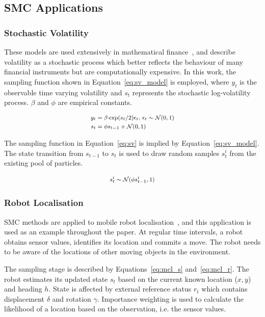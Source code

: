 \subsection{SMC Applications}
\subsubsection{Stochastic Volatility}
\label{sec:vol}

These models are used extensively in mathematical
finance~\cite{casarin04,weng12}, and describe volatility as a
stochastic process which better reflects the behaviour of many
financial instruments but are computationally expensive. In this
work, the sampling function shown in Equation~\ref{eq:sv_model} is employed,
where $y_t$ is the observable time varying volatility and $s_t$ represents the stochastic log-volatility process.
$\beta$ and $\phi$ are empirical constants.

\begin{equation}
\footnotesize
\begin{aligned}
	y_t &= \beta \exp(s_t/2)\epsilon_t \mbox{, } \epsilon_t \sim \mathcal{N}(0,1) \\
	s_t &= \phi s_{t-1} + \mathcal{N}(0,1)
\end{aligned}
\label{eq:sv_model}
\end{equation}

The sampling function in Equation~\ref{eq:sv} is implied by Equation~\ref{eq:sv_model}.
The state transition from $s_{t-1}$ to $s_t$ is used to draw random samples $s^i_t$ from the existing pool of particles.

\begin{equation}
\footnotesize
\begin{aligned}
	s^i_{t} \sim \mathcal{N}(\phi s^i_{t-1},1)
\end{aligned}
\label{eq:sv}
\end{equation}

\subsubsection{Robot Localisation}
SMC methods are applied to mobile robot localisation~\cite{montemerlo02},
and this application is used as an example throughout the paper.
At regular time intervals, a robot obtains sensor values, identifies its location and commits a move.
The robot needs to be aware of the locations of other moving objects in the environment.

The sampling stage is described by Equations~\ref{eq:mcl_s} and~\ref{eq:mcl_r}. 
The robot estimates its updated state $s_t$ based on the current known location ($x, y$) and heading $h$.
State is affected by external reference status $r_t$ which contains displacement $\delta$ and rotation $\gamma$.
Importance weighting is used to calculate the likelihood of a location based on the observation, i.e. the sensor values.

